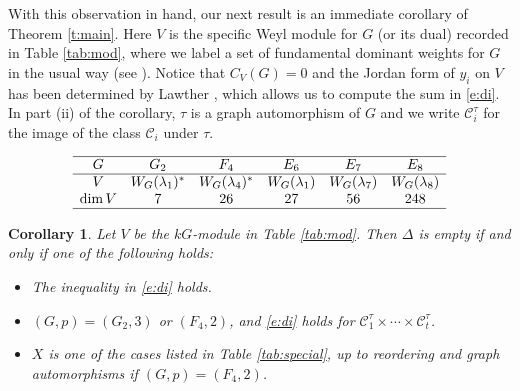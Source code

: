 \documentclass[twoside,a4paper,reqno,11pt]{amsart}
\renewcommand{\l}{\lambda}
\newcommand{\<}{\langle}
\renewcommand{\>}{\rangle}
\renewcommand{\:}{\colon}
\theoremstyle{plain}
\newtheorem{corol}[theorem]{Corollary}
\theoremstyle{definition}
\begin{document}
With this observation in hand, our next result is an immediate corollary of Theorem \ref{t:main}. Here $V$ is the specific Weyl module for $G$ (or its dual) recorded in Table \ref{tab:mod}, where we label a set of fundamental dominant weights for $G$ in the usual way (see \cite{Bou}). Notice that $C_V(G)=0$ and the Jordan form of $y_i$ on $V$ has been determined by Lawther \cite{Law1}, which allows us to compute the sum in \eqref{e:di}. In part (ii) of the corollary, $\tau$ is a graph automorphism of $G$ and we write $\mathcal{C}_i^{\tau}$ for the image of the class $\mathcal{C}_i$ under $\tau$.

{\small
\begin{table}
\[
\begin{array}{cccccc} \hline
G & G_2 & F_4 & E_6 & E_7 & E_8 \\ \hline
V & W_G(\l_1)^* & W_G(\l_4)^* & W_G(\l_1) & W_G(\l_7) & W_G(\l_8) \\
\dim V & 7 & 26 & 27 & 56 & 248 \\ \hline
\end{array}
\]
\caption{The $kG$-module $V$ in Corollary \ref{c:main}} 
\label{tab:mod}
\end{table}}

\begin{corol}\label{c:main}
Let $V$ be the $kG$-module in Table \ref{tab:mod}. Then $\Delta$ is empty if and only if one of the following holds:
\begin{itemize}\addtolength{\itemsep}{0.2\baselineskip}
\item[{\rm (i)}] The inequality in \eqref{e:di} holds.  
\item[{\rm (ii)}] $(G,p) = (G_2,3)$ or $(F_4,2)$, and \eqref{e:di} holds for
$\mathcal{C}_1^{\tau} \times \cdots \times \mathcal{C}_t^{\tau}$.
\item[{\rm (iii)}] $X$ is one of the cases listed in Table \ref{tab:special}, up to reordering and graph automorphisms if $(G,p) = (F_4,2)$.
\end{itemize} 
\end{corol}
\end{document}
